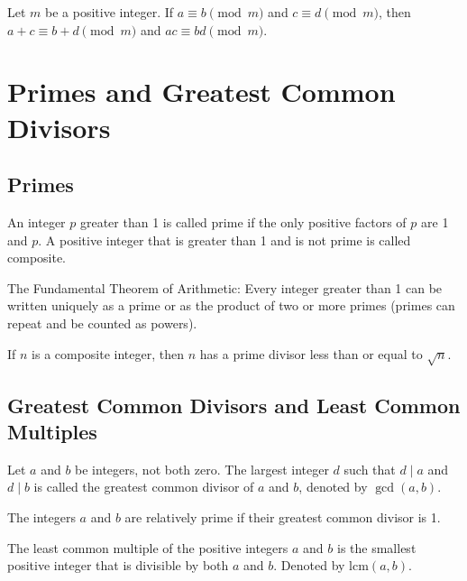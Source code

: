 \documentclass{article}
\begin{document}
\begin{theorem}
    Let \( m \) be a positive integer. If \( a \equiv b \pmod{m} \) and \( c \equiv d \pmod{m} \), then \( a + c \equiv b + d \pmod{m} \) and \( ac \equiv bd \pmod{m} \).
\end{theorem}

\section{Primes and Greatest Common Divisors}
\subsection{Primes}
\begin{proposition}
    An integer \( p \) greater than 1 is called prime if the only positive factors of \( p \) are 1 and \( p \). 
    A positive integer that is greater than 1 and is not prime is called composite.
\end{proposition}

\begin{theorem}
    The Fundamental Theorem of Arithmetic: Every integer greater than 1 can be written uniquely as a prime or as the product of two or more primes 
    (primes can repeat and be counted as powers).
\end{theorem}

\begin{theorem}
    If \( n \) is a composite integer, then \( n \) has a prime divisor less than or equal to \( \sqrt{n} \).
\end{theorem}

\subsection{Greatest Common Divisors and Least Common Multiples}
\begin{definition}
    Let \( a \) and \( b \) be integers, not both zero. The largest integer \( d \) such that \( d \mid a \) and \( d \mid b \) is called the greatest common divisor of \( a \) and \( b \), denoted by \( \gcd(a, b) \).
\end{definition}

\begin{definition}
    The integers \( a \) and \( b \) are relatively prime if their greatest common divisor is 1.
\end{definition}

\begin{definition}
    The least common multiple of the positive integers \( a \) and \( b \) is the smallest positive integer that is divisible by both \( a \) and \( b \). 
    Denoted by \( \text{lcm}(a, b) \).
\end{definition}
\end{document}
